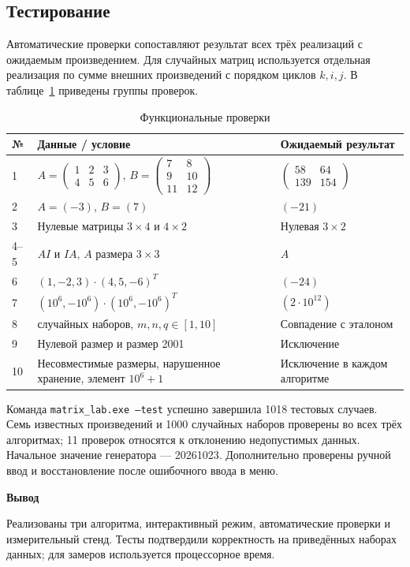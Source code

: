 \documentclass[14pt,a4paper]{extarticle}
\newcommand{\conclusion}[1]{\par\medskip\noindent\hspace*{\parindent}\textbf{Вывод}\par\indent #1\par}
\numberwithin{equation}{section}
\begin{document}
\subsection{Тестирование}
Автоматические проверки сопоставляют результат всех трёх реализаций с ожидаемым произведением. Для случайных матриц используется отдельная реализация по сумме внешних произведений с порядком циклов $k,i,j$. В таблице~\ref{tab:tests} приведены группы проверок.
\begin{table}[H]\centering\caption{Функциональные проверки}\label{tab:tests}
\small\begin{tabularx}{\textwidth}{|p{1cm}|>{\raggedright\arraybackslash}X|>{\raggedright\arraybackslash}p{3.2cm}|}\hline
№ & Данные / условие & Ожидаемый результат\\\hline
1 & $A=\left(\begin{smallmatrix}1&2&3\\4&5&6\end{smallmatrix}\right)$, $B=\left(\begin{smallmatrix}7&8\\9&10\\11&12\end{smallmatrix}\right)$ & $\left(\begin{smallmatrix}58&64\\139&154\end{smallmatrix}\right)$\\\hline
2 & $A=(-3)$, $B=(7)$ & $(-21)$\\\hline
3 & Нулевые матрицы $3\times4$ и $4\times2$ & Нулевая $3\times2$\\\hline
4--5 & $A I$ и $I A$, $A$ размера $3\times3$ & $A$\\\hline
6 & $(1,-2,3)\cdot(4,5,-6)^T$ & $(-24)$\\\hline
7 & $(10^6,-10^6)\cdot(10^6,-10^6)^T$ & $(2\cdot10^{12})$\\\hline
8 & 1000 случайных наборов, $m,n,q\in[1,10]$ & Совпадение с эталоном\\\hline
9 & Нулевой размер и размер 2001 & Исключение\\\hline
10 & Несовместимые размеры, нарушенное хранение, элемент $10^6+1$ & Исключение в каждом алгоритме\\\hline
\end{tabularx}\end{table}
Команда \texttt{matrix\_lab.exe --test} успешно завершила 1018 тестовых случаев. Семь известных произведений и 1000 случайных наборов проверены во всех трёх алгоритмах; 11 проверок относятся к отклонению недопустимых данных. Начальное значение генератора — 20261023. Дополнительно проверены ручной ввод и восстановление после ошибочного ввода в меню.
\conclusion{Реализованы три алгоритма, интерактивный режим, автоматические проверки и измерительный стенд. Тесты подтвердили корректность на приведённых наборах данных; для замеров используется процессорное время.}
\end{document}
